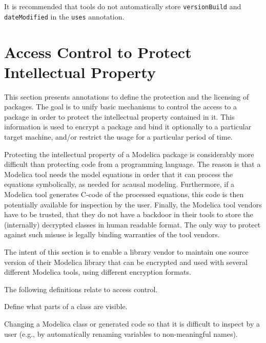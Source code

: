 \begin{nonnormative}
It is recommended that tools do not automatically store \lstinline!versionBuild! and \lstinline!dateModified! in the \lstinline!uses! annotation.
\end{nonnormative}


\section{Access Control to Protect Intellectual Property}\label{annotations-for-access-control-to-protect-intellectual-property}\label{access-control-to-protect-intellectual-property}

This section presents annotations to define the protection and the licensing of packages.
The goal is to unify basic mechanisms to control the access to a package in order to protect the intellectual property contained in it.
This information is used to encrypt a package and bind it optionally to a particular target machine, and/or restrict the usage for a particular period of time.

\begin{nonnormative}
Protecting the intellectual property of a Modelica package is considerably more difficult than protecting code from a programming language.
The reason is that a Modelica tool needs the model equations in order that it can process the equations symbolically, as needed for acausal modeling.
Furthermore, if a Modelica tool generates C-code of the processed equations, this code is then potentially available for inspection by the user.
Finally, the Modelica tool vendors have to be trusted, that they do not have a backdoor in their tools to store the (internally) decrypted classes in human readable format.
The only way to protect against such misuse is legally binding warranties of the tool vendors.

The intent of this section is to enable a library vendor to maintain one source version of their Modelica library that can be encrypted and used with several different Modelica tools, using different encryption formats.
\end{nonnormative}

The following definitions relate to access control.

\begin{definition}[Protection]
Define what parts of a class are visible.
\end{definition}

\begin{definition}[Obfuscation]
Changing a Modelica class or generated code so that it is difficult to inspect by a user (e.g., by automatically renaming variables to non-meaningful names).
\end{definition}

